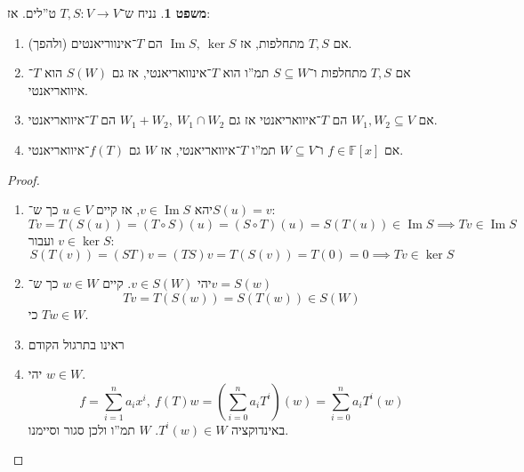 \documentclass[a4paper]{article}
\newcommand\envendproof{\vspace{-16pt}}
\DeclareMathOperator\Img   {Im}
\newcommand\F         {\mathbb{F}}
\newcommand\co        {\colon}
\newcommand\cl [1]    {\left ( #1 \right )}
\theoremstyle{definition}
\newtheorem{Theorem}{\color{myblue}משפט}
\newcommand\theo  [1] {\begin{Theorem}#1\end{Theorem}}
\begin{document}
	\theo{נניח ש־$T, S \co V \to V$ ט''לים. אז: 
		\begin{enumerate}
			\item אם $T, S$ מתחלפות, אז $\Img S, \ \ker S$ הם $T$־אינווריאנטים (ולהפך). 
			\item אם $T, S$ מתחלפות ו־$S \subseteq W$ תמ''ו הוא $T$־אינוואריאנטי, אז גם $S(W)$ הוא $T$־איוואריאנטי. 
			\item אם $W_1, W_2 \subseteq V$ הם $T$־איוואריאנטי אז גם $W_1 + W_2, \ W_1 \cap W_2$ הם $T$־איוואריאנטי. 
			\item אם $f \in \F[x]$ ו־$W \subseteq V$ תמ''ו $T$־איוואריאנטי, אז $W$ גם $f(T)$־איוואריאנטי. 
	\end{enumerate}}
	\begin{proof}\,
		\begin{enumerate}
			\item יהא $v \in \Img S$, אז קיים $u \in V$ כך ש־$S(u) = v$: 
			\[ Tv = T(S(u)) = (T \circ S)(u) = (S \circ T)(u) = S(T(u)) \in \Img S \implies Tv \in \Img S \]
			ועבור $v \in \ker S$: 
			\[ S(T(v)) = (ST)v = (TS)v = T(S(v)) = T(0) = 0 \implies Tv \in \ker S \]
			\item יהי $v \in S(W)$. קיים $w \in W$ כך ש־$v = S(w)$
			\[ Tv = T(S(w)) = S(T(w)) \in S(W) \]
			כי $Tw \in W$. 
			\item ראינו בתרגול הקודם
			\item יהי $w \in W$. 
			\[ f = \sum_{i = 1}^{n}a_ix^{i}, \ f(T)w = \cl{\sum_{i = 0}^{n}a_iT^{i}}(w) = \sum_{i = 0}^{n}a_iT^{i}(w) \]
			באינדוקציה $T^{i}(w) \in W$. $W$ תמ''ו ולכן סגור וסיימנו. 
		\end{enumerate}
		\envendproof
	\end{proof}
	
\end{document}
